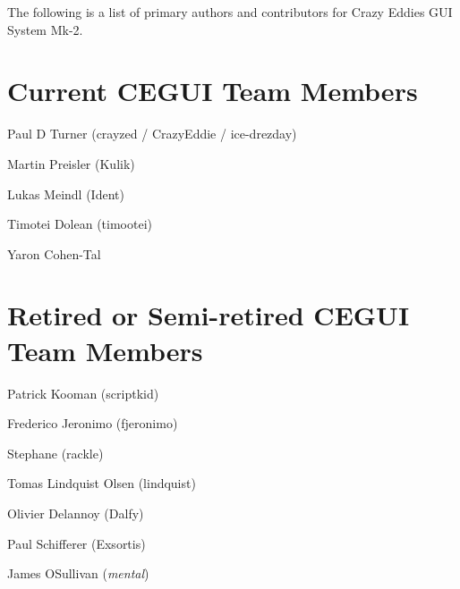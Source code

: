 The following is a list of primary authors and contributors for Crazy Eddie\textquotesingle{}s G\+UI System Mk-\/2.\hypertarget{authors_authors_sec_1}{}\section{Current C\+E\+G\+U\+I Team Members}\label{authors_authors_sec_1}

\begin{DoxyItemize}
\item Paul D Turner (crayzed / Crazy\+Eddie / ice-\/drezday)
\item Martin Preisler (Kulik)
\item Lukas Meindl (Ident)
\item Timotei Dolean (timootei)
\item Yaron Cohen-\/\+Tal
\end{DoxyItemize}\hypertarget{authors_authors_sec_2}{}\section{Retired or Semi-\/retired C\+E\+G\+U\+I Team Members}\label{authors_authors_sec_2}

\begin{DoxyItemize}
\item Patrick Kooman (scriptkid)
\item Frederico Jeronimo (fjeronimo)
\item Stephane (rackle)
\item Tomas Lindquist Olsen (lindquist)
\item Olivier Delannoy (Dalfy)
\item Paul Schifferer (Exsortis)
\item James O\textquotesingle{}Sullivan ({\itshape mental})
\end{DoxyItemize}

